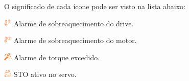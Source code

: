 O significado de cada ícone pode ser visto na lista abaixo:


\begin{unityAlarmIcons}

\item[\ding{\dingNumber}] \includegraphics[height=1em]{src/imagesICV/13-alarmsScreen/overview/drive-overtemperature-light-orange.png} Alarme de sobreaquecimento do drive.
\item[\ding{\dingNumber}] \includegraphics[height=1em]{src/imagesICV/13-alarmsScreen/overview/motor-overtemperature-orange.png} Alarme de sobreaquecimento do motor.
\item[\ding{\dingNumber}] \includegraphics[height=1em]{src/imagesICV/13-alarmsScreen/overview/torque-wrench-orange.png} Alarme de torque excedido.
\item[\ding{\dingNumber}] \includegraphics[height=1em]{src/imagesICV/13-alarmsScreen/overview/helmet-orange.png} STO ativo no servo.

\end{unityAlarmIcons}










